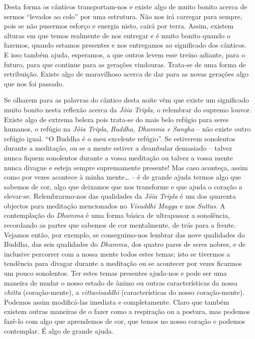 Desta forma os cânticos transportam-nos e existe algo de muito bonito
acerca de sermos ``levados ao colo'' por uma estrutura. Não nos irá
carregar para sempre, pois se não pusermos esforço e energia nisto,
cairá por terra. Assim, existem alturas em que temos realmente de nos
entregar e é muito bonito quando o fazemos, quando estamos presentes e
nos entregamos ao significado dos cânticos. E isso também ajuda,
esperamos, a que outros levem esse treino adiante, para o futuro, para
que continue para as gerações vindouras. Trata-se de uma forma de
retribuição. Existe algo de maravilhoso acerca de dar para as novas
gerações algo que nos foi passado.

Se olharem para as palavras do cântico desta noite vêm que existe um
significado muito bonito nesta reflexão acerca da \emph{Jóia Tripla}, o
relembrar do supremo louvor. Existe algo de extrema beleza pois trata-se
do mais belo refúgio para seres humanos, o refúgio na \emph{Jóia
Tripla}, \emph{Buddha, Dhamma e Sangha} -- não existe outro refúgio
igual. ``O Buddha é o meu excelente refúgio''. Se estiverem sonolentos
durante a meditação, ou se a mente estiver a deambular demasiado --
talvez nunca fiquem sonolentos durante a vossa meditação ou talvez a
vossa mente nunca divague e esteja sempre supremamente presente! Mas
caso aconteça, assim como por vezes acontece à minha mente\ldots{} -- é
de grande ajuda termos algo que sabemos de cor, algo que deixamos que
nos transforme e que ajuda o coração a elevar-se. Relembrarmo-nos das
qualidades da \emph{Jóia Tripla} é um dos quarenta objectos para
meditação mencionados no \emph{Visuddhi Magga} e nos \emph{Suttas}. A
contemplação do \emph{Dhamma} é uma forma básica de ultrapassar a
sonolência, recordando as partes que sabemos de cor mentalmente, de trás
para a frente. Vejamos então, por exemplo, se conseguimo-nos lembrar das
nove qualidades do Buddha, das seis qualidades do \emph{Dhamma,} dos
quatro pares de seres nobres, e de inclusive percorrer com a nossa mente
todos estes temas; isto se tivermos a tendência para divagar durante a
meditação ou se acontecer por vezes ficarmos um pouco sonolentos. Ter
estes temas presentes ajuda-nos e pode ser uma maneira de mudar o nosso
estado de ânimo ou outras características da nossa \emph{chitta}
(coração-mente), a \emph{cittavisaddhi} (características do nosso
coração-mente). Podemos assim modificá-las imediata e completamente.
Claro que também existem outras maneiras de o fazer como a respiração ou
a postura, mas podemos fazê-lo com algo que aprendemos de cor, que temos
no nosso coração e podemos contemplar. É algo de grande ajuda.

